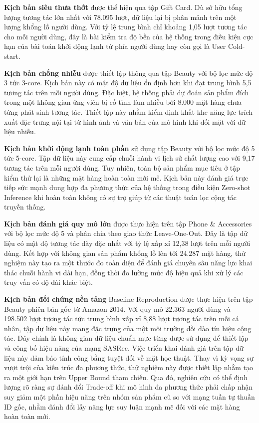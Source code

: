 \textbf{Kịch bản siêu thưa thớt} được thể hiện qua tập Gift Card. Dù sở hữu tổng lượng tương tác lớn nhất với 78.095 lượt, dữ liệu lại bị phân mảnh trên một lượng khổng lồ người dùng. Với tỷ lệ trung bình chỉ khoảng 1,05 lượt tương tác cho mỗi người dùng, đây là bài kiểm tra độ bền của hệ thống trong điều kiện cực hạn của bài toán khởi động lạnh từ phía người dùng hay còn gọi là User Cold-start.

\textbf{Kịch bản chống nhiễu} được thiết lập thông qua tập Beauty với bộ lọc mức độ 3 tức 3-core. Kịch bản này có mật độ dữ liệu ổn định hơn khi đạt trung bình 5,5 tương tác trên mỗi người dùng. Đặc biệt, hệ thống phải dự đoán sản phẩm đích trong một không gian ứng viên bị cố tình làm nhiễu bởi 8.000 mặt hàng chưa từng phát sinh tương tác. Thiết lập này nhằm kiểm định khắt khe năng lực trích xuất đặc trưng nội tại từ hình ảnh và văn bản của mô hình khi đối mặt với dữ liệu nhiễu.

\textbf{Kịch bản khởi động lạnh toàn phần} sử dụng tập Beauty với bộ lọc mức độ 5 tức 5-core. Tập dữ liệu này cung cấp chuỗi hành vi lịch sử chất lượng cao với 9,17 tương tác trên mỗi người dùng. Tuy nhiên, toàn bộ sản phẩm mục tiêu ở tập kiểm thử lại là những mặt hàng hoàn toàn mới mẻ. Kịch bản này đánh giá trực tiếp sức mạnh dung hợp đa phương thức của hệ thống trong điều kiện Zero-shot Inference khi hoàn toàn không có sự trợ giúp từ các thuật toán lọc cộng tác truyền thống.

\textbf{Kịch bản đánh giá quy mô lớn} được thực hiện trên tập Phone \& Accessories với bộ lọc mức độ 5 và phân chia theo giao thức Leave-One-Out. Đây là tập dữ liệu có mật độ tương tác dày đặc nhất với tỷ lệ xấp xỉ 12,38 lượt trên mỗi người dùng. Kết hợp với không gian sản phẩm khổng lồ lên tới 24.287 mặt hàng, thử nghiệm này tạo ra một thước đo toàn diện để đánh giá chuyên sâu năng lực khai thác chuỗi hành vi dài hạn, đồng thời đo lường mức độ hiệu quả khi xử lý các truy vấn có độ dài khác biệt.

\textbf{Kịch bản đối chứng nền tảng} Baseline Reproduction được thực hiện trên tập Beauty phiên bản gốc từ Amazon 2014. Với quy mô 22.363 người dùng và 198.502 lượt tương tác tức trung bình xấp xỉ 8,88 lượt tương tác trên mỗi cá nhân, tập dữ liệu này mang đặc trưng của một môi trường dồi dào tín hiệu cộng tác. Đây chính là không gian dữ liệu chuẩn mực từng được sử dụng để thiết lập và công bố hiệu năng của mạng SASRec. Việc triển khai đánh giá trên tập dữ liệu này đảm bảo tính công bằng tuyệt đối về mặt học thuật. Thay vì kỳ vọng sự vượt trội của kiến trúc đa phương thức, thử nghiệm này được thiết lập nhằm tạo ra một giới hạn trên Upper Bound tham chiếu. Qua đó, nghiên cứu có thể định lượng rõ ràng sự đánh đổi Trade-off khi mô hình đa phương thức phải chấp nhận suy giảm một phần hiệu năng trên nhóm sản phẩm cũ so với mạng tuần tự thuần ID gốc, nhằm đánh đổi lấy năng lực suy luận mạnh mẽ đối với các mặt hàng hoàn toàn mới.

